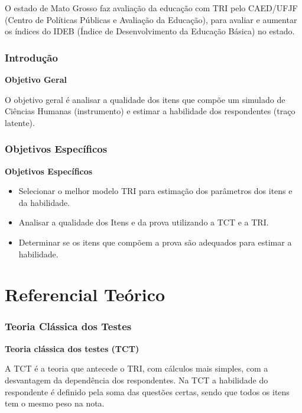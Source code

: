 \documentclass{beamer}
\begin{document}
\begin{frame}
    O estado de Mato Grosso faz avaliação da educação com TRI pelo CAED/UFJF (Centro de Políticas Públicas e Avaliação da Educação), para avaliar e aumentar os índices do IDEB (Índice de Desenvolvimento da Educação Básica) no estado.
\end{frame}
	
\begin{frame}
		\frametitle{Introdução}
		\begin{center}
		\textbf{Objetivo Geral}	
		\end{center}

		
			O objetivo geral é analisar a qualidade dos itens que compõe um simulado de Ciências Humanas (instrumento) e estimar a habilidade dos respondentes (traço latente).
			

\end{frame}
\begin{frame}
		\frametitle{Objetivos Específicos}
		\begin{center}
			\textbf{Objetivos Específicos}	
		\end{center}
		
		\begin{itemize}
			\item<1-> Selecionar o melhor modelo TRI para estimação dos parâmetros dos itens e da habilidade.
			\item<2-> Analisar a qualidade dos Itens e da prova utilizando a TCT e a TRI. 
			\item<3-> Determinar se os itens que compõem a prova são adequados para estimar a habilidade.
		\end{itemize}
\end{frame}
	
	
	\section{Referencial Teórico}
	

	\begin{frame}
		
		\frametitle{Teoria Clássica dos Testes}
		
		\begin{center}
			\textbf{Teoria clássica dos testes (TCT)}
		\end{center}
		
		A TCT é a teoria que antecede o TRI, com cálculos mais simples, com a desvantagem da dependência dos respondentes. \newline
		Na TCT a habilidade do respondente é definido pela soma das questões certas, sendo que todos os itens tem o mesmo peso na nota.
	
		
	\end{frame}		
	
\end{document}
